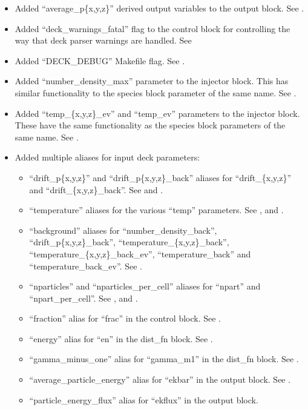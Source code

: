 \begin{itemize}
\item Added ``average\_p\{x,y,z\}'' derived output variables to the
    output block. See .
\item Added ``deck\_warnings\_fatal'' flag to the control block for controlling
    the way that deck parser warnings are handled. See 
\item Added ``DECK\_DEBUG'' Makefile flag. See .
\item Added ``number\_density\_max'' parameter to the injector block. This has
    similar functionality to the species block parameter of the same name.
    See .
\item Added ``temp\_\{x,y,z\}\_ev'' and ``temp\_ev'' parameters to the injector
    block. These have the same functionality as the species block parameters
    of the same name.  See .
\item Added multiple aliases for input deck parameters:
\begin{itemize}
\item ``drift\_p\{x,y,z\}'' and ``drift\_p\{x,y,z\}\_back'' aliases for
    ``drift\_\{x,y,z\}'' and ``drift\_\{x,y,z\}\_back''. See
     and .
\item ``temperature'' aliases for the various ``temp'' parameters. See
    ,  and .
\item ``background'' aliases for ``number\_density\_back'',
    ``drift\_p\{x,y,z\}\_back'', ``temperature\_\{x,y,z\}\_back'',
    ``temperature\_\{x,y,z\}\_back\_ev'', ``temperature\_back'' and
    ``temperature\_back\_ev''. See .
\item ``nparticles'' and ``nparticles\_per\_cell'' aliases for ``npart'' and
    ``npart\_per\_cell''. See ,  and
    .
\item ``fraction'' alias for ``frac'' in the control block.
    See .
\item ``energy'' alias for ``en'' in the dist\_fn block.
    See .
\item ``gamma\_minus\_one'' alias for ``gamma\_m1'' in the dist\_fn block.
    See .
\item ``average\_particle\_energy'' alias for ``ekbar'' in the output block.
    See .
\item ``particle\_energy\_flux'' alias for ``ekflux'' in the output block.

\end{itemize}
\end{itemize}
